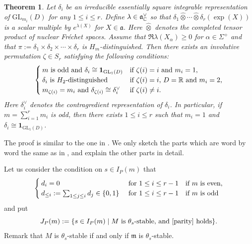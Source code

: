 \documentclass[11pt,letterpaper]{amsart}
\newcommand{\GL}{{\mathrm {GL}}} \newcommand{\PGL}{{\mathrm {PGL}}}
\newcommand{\re}{\mathfrak{R}}
\newcommand{\triv}{{\mathbf{1}}}
\renewcommand{\a}{\alpha}
\renewcommand{\l}{\lambda}
\newcommand{\z}{\zeta}
\newcommand{\fa}{\mathfrak{a}}
\newcommand{\fm}{\mathfrak{m}}
\theoremstyle{plain}
\newtheorem{thm}{Theorem}[section] \newtheorem{cor}[thm]{Corollary}
\numberwithin{equation}{section}
\begin{document}
\begin{thm}\label{app}
Let $\delta_i$ be an irreducible essentially square integrable representation of $\GL_{m_i}(D)$ for any $1\le i\le r$. 
Define $\l\in\fa_{\BC}^{\vee}$ so that $\delta_1\hat{\otimes}\cdots\hat{\otimes}\delta_r(\exp(X))$ is a scalar multiple by $e^{\l(X)}$ for $X\in\fa$. 
Here $\hat{\otimes}$ denotes the completed tensor product of nuclear Fr\'echet spaces.
Assume that $\re\l(X_{\a})\ge 0$ for $\a\in\Sigma^+$ and 
that $\pi:=\delta_1\times\delta_2\times\cdots\times\delta_r$ is $H_m$-distinguished.
Then there exists an involutive permutation $\z\in S_r$ satisfying the following conditions:
    \begin{align}\label{per}
        \begin{cases}
        \text{$m$ is odd and $\delta_i\cong\triv_{\GL_1(D)}$}&\text{if $\z(i)=i$ and $m_i=1$,}\\
        \text{$\delta_i$ is $H_{2}$-distinguished}&\text{if $\z(i)=i$, $D=\BR$ and $m_i=2$,}\\
        \text{$m_{\z(i)}=m_i$ and $\delta_{\z(i)}\cong \delta_i^{\vee}$}&\text{if $\z(i)\neq i$.}
        \end{cases}
    \end{align}
Here $\delta_i^{\vee}$ denotes the contragredient representation of $\delta_i$. 
In particular,  if $m=\sum_{i=1}^rm_i$ is odd, then there exists $1\le i\le r$ such that $m_i=1$ and $\delta_i\cong \triv_{\GL_1(D)}$.
\end{thm}

The proof is similar to the one in \cite[Theorem 1.2]{ST}. 
We only sketch the parts which are word by word the same as in \cite{ST}, and explain the other parts in detail.


Let us consider the condition on $s\in I_P(m)$ that
\begin{align}\label{parity}
\begin{cases}
d_i=0&\text{ for $1\le i\le r-1$\quad if $m$ is even},\\
d_{\le i}:=\sum_{1\le j\le i}d_j\in\{0,1\}&\text{ for $1\le i\le r-1$\quad if $m$ is odd}
\end{cases}
\end{align}
and put 
    \[
    J_P(m):=\{s\in I_P(m) \mid  \text{$M$ is $\theta_s$-stable, and \eqref{parity} holds}\}.
    \]
Remark that $M$ is $\theta_s$-stable if and only if $\fm$ is $\theta_s$-stable. 
\end{document}
